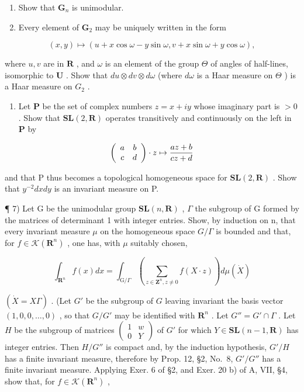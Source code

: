 \begin{enumerate}
\def\labelenumi{\alph{enumi})}
\item
  Show that \(\mathbf{G}_n\) is unimodular.
\item
  Every element of \(\mathbf{G}_2\) may be uniquely written in the form
\end{enumerate}

\[
(x, y) \mapsto (u + x \cos \omega - y \sin \omega , v + x \sin \omega + y \cos \omega),
\]

where \(u, v\) are in \(\mathbf{R}\) , and \(\omega\) is an element of the group \(\Theta\) of angles of half-lines, isomorphic to \(\mathbf{U}\) . Show that \(du \otimes dv \otimes d\omega\) (where \(d\omega\) is a Haar measure on \(\Theta\) ) is a Haar measure on \(G_2\) .

\begin{enumerate}
\def\labelenumi{\arabic{enumi})}
\setcounter{enumi}{5}
\tightlist
\item
  Let \(\mathbf{P}\) be the set of complex numbers \(z = x + iy\) whose imaginary part is \(>0\) . Show that \(\mathbf{SL}(2,\mathbf{R})\) operates transitively and continuously on the left in \(\mathbf{P}\) by
\end{enumerate}

\[
\left( \begin{array}{c c} a & b \\ c & d \end{array} \right) \cdot z \mapsto \frac {a z + b}{c z + d}
\]

and that P thus becomes a topological homogeneous space for \(\mathbf{SL}(2,\mathbf{R})\) . Show that \(y^{-2}dx dy\) is an invariant measure on P.

¶ 7) Let G be the unimodular group \(\mathbf{SL}(n,\mathbf{R})\) , \(\Gamma\) the subgroup of G formed by the matrices of determinant 1 with integer entries. Show, by induction on n, that every invariant measure \(\mu\) on the homogeneous space \(G/\Gamma\) is bounded and that, for \(f \in \mathcal{K}(\mathbf{R}^{n})\) , one has, with \(\mu\) suitably chosen,

\[
\int_ {\mathbf {R} ^ {n}} f (x) d x = \int_ {\mathrm{G} / \Gamma} \left(\sum_ {z \in \mathbf {Z} ^ {n}, z \neq 0} f (X \cdot z)\right) d \mu (\dot {X})\tag{1}
\]

\((\dot{X} = X\Gamma)\) . (Let \(G'\) be the subgroup of \(G\) leaving invariant the basis vector \((1,0,0,\ldots,0)\) , so that \(G/G'\) may be identified with \(\mathbf{R}^n\) . Let \(G'' = G' \cap \Gamma\) . Let \(H\) be the subgroup of matrices \(\begin{pmatrix} 1 & w \\ 0 & Y \end{pmatrix}\) of \(G'\) for which \(Y \in \mathbf{SL}(n-1, \mathbf{R})\) has integer entries. Then \(H/G''\) is compact and, by the induction hypothesis, \(G'/H\) has a finite invariant measure, therefore by Prop. 12, §2, No.~8, \(G'/G''\) has a finite invariant measure. Applying Exer. 6 of §2, and Exer. 20 b) of A, VII, §4, show that, for \(f \in \mathcal{K}(\mathbf{R}^n)\) ,

